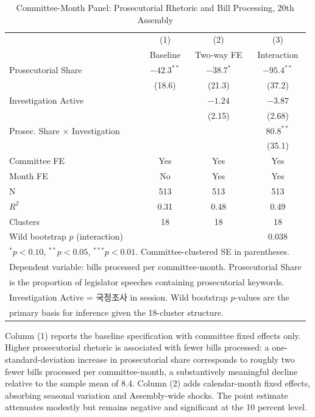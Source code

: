 \documentclass[11pt]{article}
\begin{document}
\begin{table}[htbp]
\centering
\caption{Committee-Month Panel: Prosecutorial Rhetoric and Bill Processing, 20th Assembly}
\label{tab:main}
\begin{tabular}{lccc}
\toprule
 & (1) & (2) & (3) \\
 & Baseline & Two-way FE & Interaction \\
\midrule
Prosecutorial Share & $-42.3^{**}$ & $-38.7^{*}$ & $-95.4^{**}$ \\
 & (18.6) & (21.3) & (37.2) \\
Investigation Active & & $-1.24$ & $-3.87$ \\
 & & (2.15) & (2.68) \\
Prosec. Share $\times$ Investigation & & & $80.8^{**}$ \\
 & & & (35.1) \\
\midrule
Committee FE & Yes & Yes & Yes \\
Month FE & No & Yes & Yes \\
N & 513 & 513 & 513 \\
$R^2$ & 0.31 & 0.48 & 0.49 \\
Clusters & 18 & 18 & 18 \\
Wild bootstrap $p$ (interaction) & & & 0.038 \\
\bottomrule
\multicolumn{4}{l}{\footnotesize $^*p<0.10$, $^{**}p<0.05$, $^{***}p<0.01$. Committee-clustered SE in parentheses.} \\
\multicolumn{4}{l}{\footnotesize Dependent variable: bills processed per committee-month. Prosecutorial Share} \\
\multicolumn{4}{l}{\footnotesize is the proportion of legislator speeches containing prosecutorial keywords.} \\
\multicolumn{4}{l}{\footnotesize Investigation Active = 국정조사 in session. Wild bootstrap $p$-values are the} \\
\multicolumn{4}{l}{\footnotesize primary basis for inference given the 18-cluster structure.} \\
\end{tabular}
\end{table}

Column (1) reports the baseline specification with committee fixed effects only. Higher prosecutorial rhetoric is associated with fewer bills processed: a one-standard-deviation increase in prosecutorial share corresponds to roughly two fewer bills processed per committee-month, a substantively meaningful decline relative to the sample mean of 8.4. Column (2) adds calendar-month fixed effects, absorbing seasonal variation and Assembly-wide shocks. The point estimate attenuates modestly but remains negative and significant at the 10 percent level.
\end{document}
